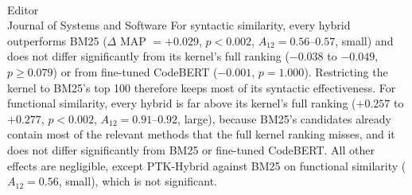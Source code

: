 \documentclass[
pagenumber=false, %
parskip=half, %
fromalign=right, %
foldmarks=false, %
addrfield=false %
]{scrlttr2}
\begin{document}
\begin{letter}{\\Editor\\Journal of Systems and Software}
\medskip\noindent For syntactic similarity, every hybrid outperforms BM25 ($\Delta$ MAP $= +0.029$,
$p < 0.002$, $A_{12} = 0.56$--$0.57$, small) and does not differ significantly from its kernel's full
ranking ($-0.038$ to $-0.049$, $p \geq 0.079$) or from fine-tuned CodeBERT ($-0.001$, $p = 1.000$).
Restricting the kernel to BM25's top 100 therefore keeps most of its syntactic effectiveness. For
functional similarity, every hybrid is far above its kernel's full ranking ($+0.257$ to $+0.277$,
$p < 0.002$, $A_{12} = 0.91$--$0.92$, large), because BM25's candidates already contain most of the
relevant methods that the full kernel ranking misses, and it does not differ significantly from BM25
or fine-tuned CodeBERT.
All other effects are negligible, except PTK-Hybrid against BM25 on functional similarity
($A_{12} = 0.56$, small), which is not significant.


	\end{letter}
		

	
\end{document}
